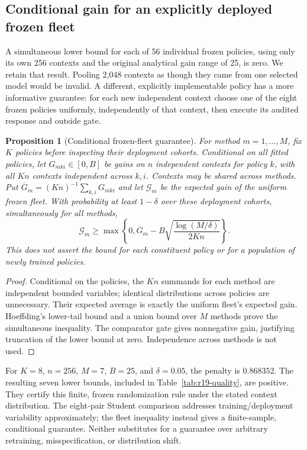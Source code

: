 \documentclass[11pt,letterpaper]{article}
\newtheorem{proposition}[theorem]{Proposition}
\theoremstyle{definition}
\newcommand{\1}{\mathbf 1}
\begin{document}
\subsection{Conditional gain for an explicitly deployed frozen fleet}
A simultaneous lower bound for each of 56 individual frozen policies, using only its own 256 contexts and the original analytical gain range of 25, is zero. We retain that result. Pooling 2,048 contexts as though they came from one selected model would be invalid. A different, explicitly implementable policy has a more informative guarantee: for each new independent context choose one of the eight frozen policies uniformly, independently of that context, then execute its audited response and outside gate.

\begin{proposition}[Conditional frozen-fleet guarantee]\label{prop:r19-fleet}
For method $m=1,\ldots,M$, fix $K$ policies before inspecting their deployment cohorts. Conditional on all fitted policies, let $G_{mki}\in[0,B]$ be gains on $n$ independent contexts for policy $k$, with all $Kn$ contexts independent across $k,i$. Contexts may be shared across methods. Put $\overline G_m=(Kn)^{-1}\sum_{k,i}G_{mki}$ and let $\mathcal G_m$ be the expected gain of the uniform frozen fleet. With probability at least $1-\delta$ over these deployment cohorts, simultaneously for all methods,
\begin{equation}\label{eq:r19-fleet}
 \mathcal G_m\geq\max\left\{0,\overline G_m-
 B\sqrt{\frac{\log(M/\delta)}{2Kn}}\right\}.
\end{equation}
This does not assert the bound for each constituent policy or for a population of newly trained policies.
\end{proposition}
\begin{proof}
Conditional on the policies, the $Kn$ summands for each method are independent bounded variables; identical distributions across policies are unnecessary. Their expected average is exactly the uniform fleet's expected gain. Hoeffding's lower-tail bound and a union bound over $M$ methods prove the simultaneous inequality. The comparator gate gives nonnegative gain, justifying truncation of the lower bound at zero. Independence across methods is not used.
\end{proof}
For $K=8$, $n=256$, $M=7$, $B=25$, and $\delta=0.05$, the penalty is $0.868352$. The resulting seven lower bounds, included in Table~\ref{tab:r19-quality}, are positive. They certify this finite, frozen randomization rule under the stated context distribution. The eight-pair Student comparison addresses training/deployment variability approximately; the fleet inequality instead gives a finite-sample, conditional guarantee. Neither substitutes for a guarantee over arbitrary retraining, misspecification, or distribution shift.
\end{document}
